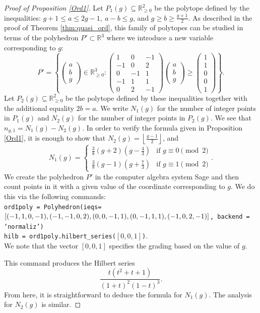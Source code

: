 \documentclass[12pt]{amsart}
\newcommand{\R}{{\mathbb R}}
\theoremstyle{plain}\newtheorem{proposition}{Proposition}[section]
\begin{document}
\begin{proof}[Proof of Proposition \ref{Ord1}]
Let $P_1(g) \subseteq \R_{\ge 0}^2$ be the polytope defined by the inequalities: $g+1 \le a \le 2g-1,\ a-b \le g$, and $g \ge b \ge \frac{g+1}{2}$.  As described in the proof of Theorem \ref{thm:quasi_ord}, this family of polytopes can be studied in terms of the polyhedron $P' \subset \R^3$ where we introduce a new variable corresponding to $g$:
\[
P' = \left\{ \left(\begin{array}{c} 
a \\ b \\ g
\end{array}\right) \in \R_{\ge 0}^3 \colon
\left(\begin{array}{ccc} 
1 & 0 & -1\\
-1 & 0 & 2\\
0 & -1 & 1\\
-1 & 1 & 1\\
0 & 2 & -1
\end{array}\right)
\left(\begin{array}{c} 
a\\
b\\
g
\end{array}\right)
\ge 
\left(\begin{array}{c} 
1 \\
1 \\
0 \\
0 \\
1 
\end{array}\right)
\right\}.
\]
Let $P_2(g) \subseteq \R_{\ge 0}^2$ be the polytope defined by these inequalities together with the additional equality $2b = a$.  We write $N_1(g)$ for the number of integer points in $P_1(g)$ and $N_2(g)$ for the number of integer points in $P_2(g)$.  We see that $n_{g,1} = N_1(g) - N_2(g)$.  In order to verify the formula given in Proposition \ref{Ord1}, it is enough to show that $N_2(g) = \left\lfloor \frac{g-1}{2}\right\rfloor$, and 
\[
N_1(g) = 
\begin{cases} 
\frac{3}{8} (g+2) \left(g-\frac{4}{3}\right) & \text{if } g \equiv 0 \pmod{2} \\ 
\frac{3}{8} (g-1)\left(g+\frac{7}{3}\right) & \text{if } g \equiv 1 \pmod{2}
\end{cases}.
\]
We create the polyhedron $P'$ in the computer algebra system Sage and then count points in it with a given value of the coordinate corresponding to $g$.  We do this via the following commands:\\
\texttt{ord1poly = Polyhedron(ieqs=$[(-1,1,0,-1),(-1,-1,0,2),(0,0,-1,1),(0,-1,1,1),\\
(-1,0,2,-1)]$, backend = `normaliz')\\
hilb = ord1poly.hilbert\_series($[0,0,1]$)}.\\
We note that the vector $[0,0,1]$ specifies the grading based on the value of $g$.  

This command produces the Hilbert series 
 \[
\frac{t  (t^{2} + t + 1)}{ (1 + t)^{2}  (1 - t)^{3}}.
 \]
 From here, it is straightforward to deduce the formula for $N_1(g)$.  The analysis for $N_2(g)$ is similar.
\end{proof}
\end{document}
